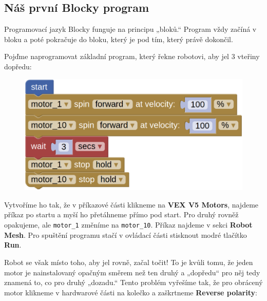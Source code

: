 \documentclass[../main.tex]{subfiles}
\begin{document}
	\subsection{Náš první Blocky program}

	Programovací jazyk Blocky funguje na principu „bloků.“ Program vždy začíná v bloku  a poté pokračuje do bloku, který je pod tím, který právě dokončil.

	Pojďme naprogramovat základní program, který řekne robotovi, aby jel $3$ vteřiny dopředu:

	\begin{figure}[h!]
		\centering
		\begin{minipage}{0.5\textwidth}
			\includegraphics[width=\linewidth]{../Images/01/program-1.png}
		\end{minipage}
	\end{figure}

	Vytvoříme ho tak, že v příkazové části klikneme na \textbf{VEX V5 Motors}, najdeme příkaz po startu a myší ho přetáhneme přímo pod start. Pro druhý rovněž opakujeme, ale \texttt{motor\_1} změníme na \texttt{motor\_10}. Příkaz  najdeme v sekci \textbf{Robot Mesh}. Pro spuštění programu stačí v ovládací části stisknout modré tlačítko \textbf{Run}.

	Robot se však místo toho, aby jel rovně, začal točit! To je kvůli tomu, že jeden motor je nainstalovaný opačným směrem než ten druhý a „dopředu“ pro něj tedy znamená to, co pro druhý „dozadu.“ Tento problém vyřešíme tak, že pro obrácený motor klikneme v hardwarové části na kolečko a zaškrtneme \textbf{Reverse polarity}:
\end{document}
